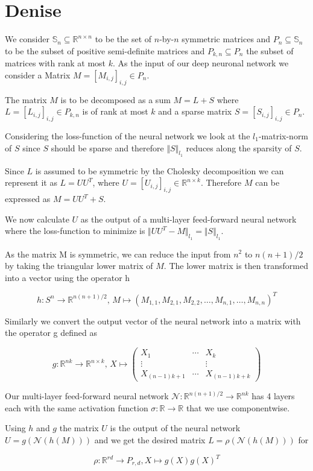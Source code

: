 \section{Denise}

We consider $\mathbb{S}_n \subseteq \mathbb{R}^{n \times n}$ to be the set of $n$-by-$n$ symmetric matrices and $P_n\subseteq \mathbb{S}_n$ to be the subset of positive semi-definite matrices and $P_{k,n} \subseteq P_n$ the subset of matrices with rank at most $k$. As the input of our deep neuronal network we consider a Matrix $M = [M_{i,j}]_{i,j} \in P_n$. 
\newline

The matrix $M$ is to be decomposed as a sum $M = L + S$ where $L = [L_{i,j}]_{i,j} \in P_{k,n}$ is of rank at most $k$ and a sparse matrix $S = [S_{i,j}]_{i,j} \in P_n$.
\newline

Considering the loss-function of the neural network we look at the $l_1$-matrix-norm of $S$ since $S$ should be sparse and therefore $\Vert S \Vert_{l_1}$ reduces along the sparsity of $S$.
\newline

Since $L$ is assumed to be symmetric by the Cholesky decomposition we can represent it as $L=UU^T$, where $U = [U_{i,j}]_{i,j} \in \mathbb{R}^{n \times k}$. Therefore $M$ can be expressed as $M = UU^T + S$.
\newline

We now calculate $U$ as the output of a multi-layer feed-forward neural network where the loss-function to minimize is $\Vert UU^T - M \Vert_{l_1} = \Vert S \Vert_{l_1}$.
\newline

As the matrix M is symmetric, we can reduce the input from $n^2$ to $n(n + 1)/2$ by taking the triangular lower matrix of $M$. The lower matrix is then transformed into a vector using the operator h
\newline

\[h: S^n \to \mathbb{R}^{n(n+1)/2}, \, M \mapsto (M_{1,1},M_{2,1},M_{2,2},\dots,M_{n,1},\dots,M_{n,n})^T\]

Similarly we convert the output vector of the neural network into a matrix with the operator g defined as

\[g : \mathbb{R}^{nk} \to \mathbb{R}^{n \times k}, \, X \mapsto \begin{pmatrix} X_1 & \cdots & X_k \\ \vdots & & \vdots \\ X_{(n-1)k + 1} & \cdots& X_{(n-1)k+k}\end{pmatrix}\]

Our multi-layer feed-forward neural network $\mathcal{N}: \mathbb{R}^{n(n+1)/2} \to \mathbb{R}^{nk} $ has 4 layers each with the same activation function $\sigma : \mathbb{R} \to \mathbb{R}$ that we use componentwise.
\newline

Using $h$ and $g$ the matrix $U$ is the output of the neural network $U = g(\mathcal{N}(h(M)))$ and we  get the desired matrix $L=\rho(\mathcal{N}(h(M)))$ for

\[\rho : \mathbb{R}^{rd} \to P_{r,d}, X \mapsto g(X)g(X)^T\]

